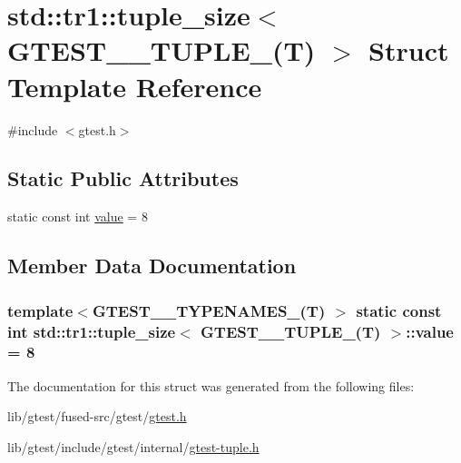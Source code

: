 \hypertarget{structstd_1_1tr1_1_1tuple__size_3_01_g_t_e_s_t__8___t_u_p_l_e___07_t_08_01_4}{\section{std\-:\-:tr1\-:\-:tuple\-\_\-size$<$ G\-T\-E\-S\-T\-\_\-\_\-\-T\-U\-P\-L\-E\-\_\-(T) $>$ Struct Template Reference}
\label{structstd_1_1tr1_1_1tuple__size_3_01_g_t_e_s_t__8___t_u_p_l_e___07_t_08_01_4}
}


{\ttfamily \#include $<$gtest.\-h$>$}

\subsection*{Static Public Attributes}
\begin{DoxyCompactItemize}
\item 
static const int \hyperlink{structstd_1_1tr1_1_1tuple__size_3_01_g_t_e_s_t__8___t_u_p_l_e___07_t_08_01_4_a22bf7896455cda240d07e3661b2f102e}{value} = 8
\end{DoxyCompactItemize}


\subsection{Member Data Documentation}
\hypertarget{structstd_1_1tr1_1_1tuple__size_3_01_g_t_e_s_t__8___t_u_p_l_e___07_t_08_01_4_a22bf7896455cda240d07e3661b2f102e}{
\subsubsection[{value}]{\setlength{\rightskip}{0pt plus 5cm}template$<$G\-T\-E\-S\-T\-\_\-\_\-\-T\-Y\-P\-E\-N\-A\-M\-E\-S\-\_\-(\-T) $>$ static const int {\bf std\-::tr1\-::tuple\-\_\-size}$<$ {\bf G\-T\-E\-S\-T\-\_\-\_\-\-T\-U\-P\-L\-E\-\_\-}(T) $>$\-::value = 8\hspace{0.3cm}{\ttfamily [static]}}}\label{structstd_1_1tr1_1_1tuple__size_3_01_g_t_e_s_t__8___t_u_p_l_e___07_t_08_01_4_a22bf7896455cda240d07e3661b2f102e}


The documentation for this struct was generated from the following files\-:\begin{DoxyCompactItemize}
\item 
lib/gtest/fused-\/src/gtest/\hyperlink{fused-src_2gtest_2gtest_8h}{gtest.\-h}\item 
lib/gtest/include/gtest/internal/\hyperlink{gtest-tuple_8h}{gtest-\/tuple.\-h}\end{DoxyCompactItemize}
